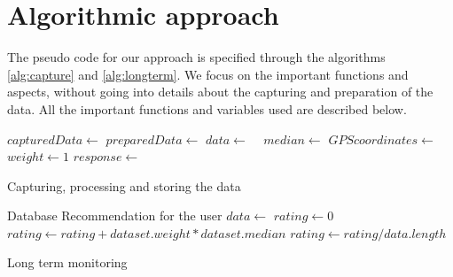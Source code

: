 \section{Algorithmic approach}
\indent					%
\indent
The pseudo code for our approach is specified through the algorithms \ref{alg:capture} and \ref{alg:longterm}.
We focus on the important functions and aspects, without going into details about the capturing and preparation of the data.
All the important functions and variables used are described below.
\begin{algorithm}[htbp]
	\begin{algorithmic}[1]
		\Repeat
		\State $capturedData \gets$ 
		\State $preparedData \gets$ 
		\State $data \gets$  
		\EndFor
		\State $median \gets$  
		\State $GPScoordinates \gets$ 
		\State $weight \gets 1$  
			\State $response \gets$ 
			 
				\State {}
			\Else
				\State {}			\EndIf
		\EndIf
				
		\State {} 
		\State {}	
	\end{algorithmic}
	\caption{Capturing, processing and storing the data}
	\label{alg:capture}
\end{algorithm}
\begin{algorithm}[htbp]
	\begin{algorithmic}[1]	
		\Require Database
		\Ensure Recommendation for the user
		\Cus
		\State $data \gets$ 
		\State $rating \gets 0$	
		 
		\State $rating \gets rating + dataset.weight * dataset.median$
		\EndFor
		\State $rating \gets rating / data.length$ 
			\State {}
		\EndIf
		\EndCus
	\end{algorithmic}
	\caption{Long term monitoring}
	\label{alg:longterm}
\end{algorithm}

